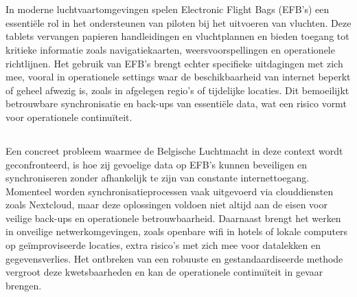 
\chapter{}%
\label{ch:inleiding}

In moderne luchtvaartomgevingen spelen Electronic Flight Bags (EFB's) een essentiële rol in het ondersteunen van piloten bij het uitvoeren van vluchten. Deze tablets vervangen papieren handleidingen en vluchtplannen en bieden toegang tot kritieke informatie zoals navigatiekaarten, weersvoorspellingen en operationele richtlijnen. Het gebruik van EFB's brengt echter specifieke uitdagingen met zich mee, vooral in operationele settings waar de beschikbaarheid van internet beperkt of geheel afwezig is, zoals in afgelegen regio's of tijdelijke locaties. Dit bemoeilijkt betrouwbare synchronisatie en back-ups van essentiële data, wat een risico vormt voor operationele continuïteit.

\section{}%
\label{sec:probleemstelling}

Een concreet probleem waarmee de Belgische Luchtmacht in deze context wordt geconfronteerd, is hoe zij gevoelige data op EFB's kunnen beveiligen en synchroniseren zonder afhankelijk te zijn van constante internettoegang. Momenteel worden synchronisatieprocessen vaak uitgevoerd via clouddiensten zoals Nextcloud, maar deze oplossingen voldoen niet altijd aan de eisen voor veilige back-ups en operationele betrouwbaarheid. Daarnaast brengt het werken in onveilige netwerkomgevingen, zoals openbare wifi in hotels of lokale computers op geïmproviseerde locaties, extra risico’s met zich mee voor datalekken en gegevensverlies. Het ontbreken van een robuuste en gestandaardiseerde methode vergroot deze kwetsbaarheden en kan de operationele continuïteit in gevaar brengen.

\section{}%
\label{sec:onderzoeksvraag}

